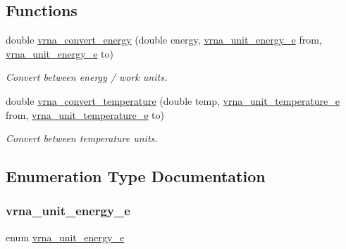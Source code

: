 \subsection*{Functions}
\begin{DoxyCompactItemize}
\item 
double \hyperlink{group__units_gada3216e97b410928ba19a4487e5fe6f2}{vrna\+\_\+convert\+\_\+energy} (double energy, \hyperlink{group__units_ga1d2fd1e73caf995e4dc69072b33e6ba5}{vrna\+\_\+unit\+\_\+energy\+\_\+e} from, \hyperlink{group__units_ga1d2fd1e73caf995e4dc69072b33e6ba5}{vrna\+\_\+unit\+\_\+energy\+\_\+e} to)
\begin{DoxyCompactList}\small\item\em Convert between energy / work units. \end{DoxyCompactList}\item 
double \hyperlink{group__units_gaf1bb1db32eba33b9f306214f5955d0c2}{vrna\+\_\+convert\+\_\+temperature} (double temp, \hyperlink{group__units_gadeca8d9e91ef85f1b652cc8aef63d7e4}{vrna\+\_\+unit\+\_\+temperature\+\_\+e} from, \hyperlink{group__units_gadeca8d9e91ef85f1b652cc8aef63d7e4}{vrna\+\_\+unit\+\_\+temperature\+\_\+e} to)
\begin{DoxyCompactList}\small\item\em Convert between temperature units. \end{DoxyCompactList}\end{DoxyCompactItemize}


\subsection{Enumeration Type Documentation}
\mbox{\label{group__units_ga1d2fd1e73caf995e4dc69072b33e6ba5}} 
\subsubsection{\texorpdfstring{vrna\+\_\+unit\+\_\+energy\+\_\+e}{vrna\_unit\_energy\_e}}
{\footnotesize\ttfamily enum \hyperlink{group__units_ga1d2fd1e73caf995e4dc69072b33e6ba5}{vrna\+\_\+unit\+\_\+energy\+\_\+e}}




